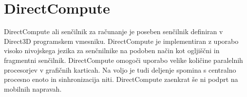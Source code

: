 \section{DirectCompute}

DirectCompute \cite{directcompute} ali senčilnik za računanje je poseben senčilnik definiran v Direct3D programskem vmesniku. DirectCompute je implementiran z uporabo visoko nivojskega jezika za senčnilnike na podoben način kot ogljiščni in fragmentni senčilnik. DirectCompute omogoči uporabo velike količine paralelnih procesorjev v grafičnih karticah. Na voljo je tudi deljenje spomina s centralno procesno enoto in sinhronizacija niti. DirectCompute zaenkrat še ni podprt na mobilnih napravah.

